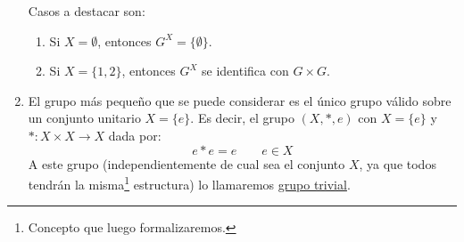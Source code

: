 \begin{ejemplo}
\begin{enumerate}
             Casos a destacar son:
             \begin{enumerate}
                 \item Si $X=\emptyset $, entonces $G^X = \{\emptyset \}$.
                 \item Si $X = \{1,2\}$, entonces $G^X$ se identifica con $G\times G$.
             \end{enumerate}
         \item El grupo más pequeño que se puede considerar es el único grupo válido sobre un conjunto unitario $X=\{e\}$. Es decir, el grupo $(X,\ast,e)$ con $X = \{e\}$ y $\ast:X\times X\rightarrow X$ dada por:
             \begin{equation*}
                 e\ast e = e \qquad e\in X
             \end{equation*}
             A este grupo (independientemente de cual sea el conjunto $X$, ya que todos tendrán la misma\footnote{Concepto que luego formalizaremos.} estructura) lo llamaremos \underline{grupo trivial}.
     \end{enumerate}
\end{ejemplo}

